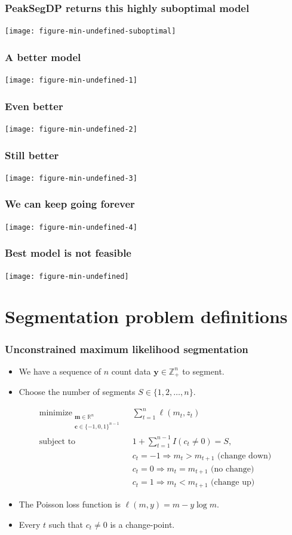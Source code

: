 \documentclass{beamer}
\DeclareMathOperator*{\minimize}{minimize}
\newcommand{\RR}{\mathbb R}
\newcommand{\ZZ}{\mathbb Z}
\begin{document}
\begin{frame}
  \frametitle{PeakSegDP returns this highly suboptimal model}
  \texttt{[image: figure-min-undefined-suboptimal]}
\end{frame}

\begin{frame}
  \frametitle{A better model}
  \texttt{[image: figure-min-undefined-1]}
\end{frame}

\begin{frame}
  \frametitle{Even better}
  \texttt{[image: figure-min-undefined-2]}
\end{frame}

\begin{frame}
  \frametitle{Still better}
  \texttt{[image: figure-min-undefined-3]}
\end{frame}

\begin{frame}
  \frametitle{We can keep going forever}
  \texttt{[image: figure-min-undefined-4]}
\end{frame}

\begin{frame}
  \frametitle{Best model is not feasible}
  \texttt{[image: figure-min-undefined]}
\end{frame}
 
\section*{Segmentation problem definitions}

\begin{frame}
  \frametitle{Unconstrained maximum likelihood segmentation}
  \begin{itemize}
  \item We have a sequence of $n$ count data $\mathbf y\in\ZZ_+^n$ to
    segment. 
  \item Choose the number of segments $S\in\{1, 2, \dots, n\}$.
  \end{itemize}
\begin{align*}
  \minimize_{\substack{
  \mathbf m\in\RR^{n}
\\
  \mathbf c\in\{-1,0,1\}^{n-1}
  }} &\ \ 
    \sum_{t=1}^n \ell( m_t,  z_t) 
\\
    \text{subject to} &\ \  1+\sum_{t=1}^{n-1} I(c_t \neq 0) = S, 
\nonumber\\
& \ \ c_t = -1 \Rightarrow m_{t} > m_{t+1} \text{ (change down)}
\nonumber\\
& \ \ c_t = 0 \Rightarrow m_{t} = m_{t+1}  \text{ (no change)}
\nonumber\\
& \ \ c_t = 1 \Rightarrow m_{t} < m_{t+1} \text{ (change up)}
\nonumber
\end{align*}
\begin{itemize}
\item The Poisson loss function is  $\ell( m,  y)= m - y \log m$.
\item Every $t$ such that $c_t \neq 0$ is a
change-point.
\end{itemize}

\end{frame}
\end{document}
